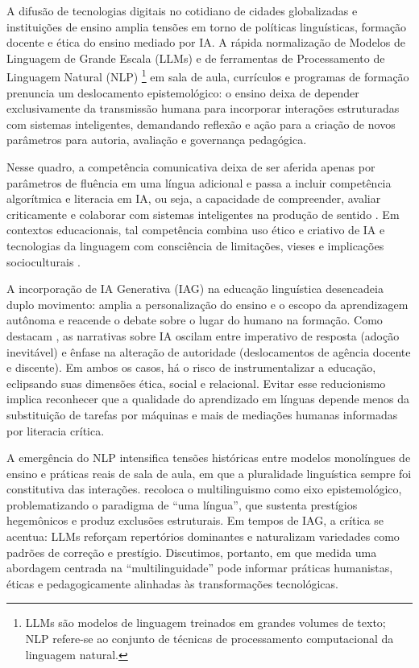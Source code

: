 \documentclass[portuguese]{textolivre}
\begin{document}
A difusão de tecnologias digitais no cotidiano de cidades globalizadas e instituições de ensino amplia tensões em torno de políticas linguísticas, formação docente e ética do ensino mediado por IA. A rápida normalização de Modelos de Linguagem de Grande Escala (LLMs) e de ferramentas de Processamento de Linguagem Natural (NLP) \footnote{LLMs são modelos de linguagem treinados em grandes volumes de texto; NLP refere-se ao conjunto de técnicas de processamento computacional da linguagem natural.} em sala de aula, currículos e programas de formação prenuncia um deslocamento epistemológico: o ensino deixa de depender exclusivamente da transmissão humana para incorporar interações estruturadas com sistemas inteligentes, demandando reflexão e ação para a criação de novos parâmetros para autoria, avaliação e governança pedagógica.

Nesse quadro, a competência comunicativa deixa de ser aferida apenas por parâmetros de fluência em uma língua adicional e passa a incluir competência algorítmica e literacia em IA, ou seja, a capacidade de compreender, avaliar criticamente e colaborar com sistemas inteligentes na produção de sentido \cite{LongMagerko2020, SperlingEtAl2024}. Em contextos educacionais, tal competência combina uso ético e criativo de IA e tecnologias da linguagem com consciência de limitações, vieses e implicações socioculturais \cite{UNESCO2023, UNESCO2025}.

A incorporação de IA Generativa (IAG) na educação linguística desencadeia duplo movimento: amplia a personalização do ensino e o escopo da aprendizagem autônoma e reacende o debate sobre o lugar do humano na formação. Como destacam \textcite{BearmanRyanAjjawi2023}, as narrativas sobre IA oscilam entre imperativo de resposta (adoção inevitável) e ênfase na alteração de autoridade (deslocamentos de agência docente e discente). Em ambos os casos, há o risco de instrumentalizar a educação, eclipsando suas dimensões ética, social e relacional. Evitar esse reducionismo implica reconhecer que a qualidade do aprendizado em línguas depende menos da substituição de tarefas por máquinas e mais de mediações humanas informadas por literacia crítica.

A emergência do NLP intensifica tensões históricas entre modelos monolíngues de ensino e práticas reais de sala de aula, em que a pluralidade linguística sempre foi constitutiva das interações. \textcite{Agnihotri2025} recoloca o multilinguismo como eixo epistemológico, problematizando o paradigma de “uma língua”, que sustenta prestígios hegemônicos e produz exclusões estruturais. Em tempos de IAG, a crítica se acentua: LLMs reforçam repertórios dominantes e naturalizam variedades como padrões de correção e prestígio. Discutimos, portanto, em que medida uma abordagem centrada na “multilinguidade” \cite{Agnihotri2025} pode informar práticas humanistas, éticas e pedagogicamente alinhadas às transformações tecnológicas.
\end{document}

